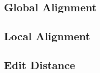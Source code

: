 

\subsection{Global Alignment}



\subsection{Local Alignment}



\subsection{Edit Distance}


\fi 
